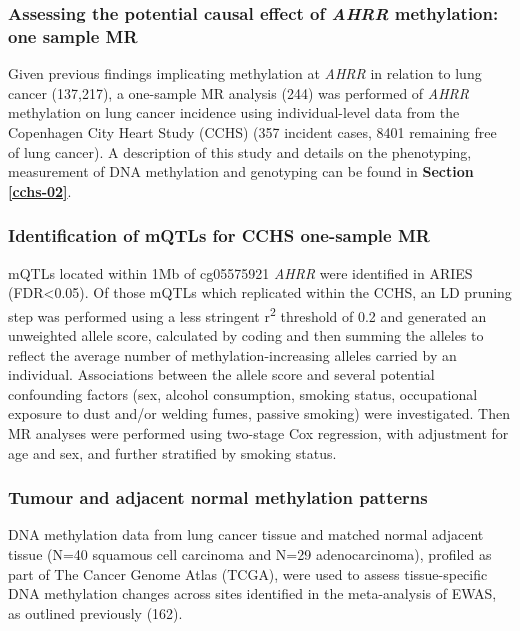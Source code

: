 \documentclass[11pt,twoside]{bristolthesis}
\begin{document}
\hypertarget{ahrr-one-sample-mr-methods}{%
\subsubsection{\texorpdfstring{Assessing the potential causal effect of \emph{AHRR} methylation: one sample MR}{Assessing the potential causal effect of AHRR methylation: one sample MR}}\label{ahrr-one-sample-mr-methods}}

Given previous findings implicating methylation at \emph{AHRR} in relation to lung cancer (137,217), a one-sample MR analysis (244) was performed of \emph{AHRR} methylation on lung cancer incidence using individual-level data from the Copenhagen City Heart Study (CCHS) (357 incident cases, 8401 remaining free of lung cancer). A description of this study and details on the phenotyping, measurement of DNA methylation and genotyping can be found in \textbf{Section \ref{cchs-02}}.

\hypertarget{identification-of-mqtls-for-cchs-one-sample-mr}{%
\subsubsection{Identification of mQTLs for CCHS one-sample MR}\label{identification-of-mqtls-for-cchs-one-sample-mr}}

mQTLs located within 1Mb of cg05575921 \emph{AHRR} were identified in ARIES (FDR\textless0.05). Of those mQTLs which replicated within the CCHS, an LD pruning step was performed using a less stringent r\textsuperscript{2} threshold of 0.2 and generated an unweighted allele score, calculated by coding and then summing the alleles to reflect the average number of methylation-increasing alleles carried by an individual. Associations between the allele score and several potential confounding factors (sex, alcohol consumption, smoking status, occupational exposure to dust and/or welding fumes, passive smoking) were investigated. Then MR analyses were performed using two-stage Cox regression, with adjustment for age and sex, and further stratified by smoking status.

\hypertarget{lc-heathly-v-normal-methods}{%
\subsubsection{Tumour and adjacent normal methylation patterns}\label{lc-heathly-v-normal-methods}}

DNA methylation data from lung cancer tissue and matched normal adjacent tissue (N=40 squamous cell carcinoma and N=29 adenocarcinoma), profiled as part of The Cancer Genome Atlas (TCGA), were used to assess tissue-specific DNA methylation changes across sites identified in the meta-analysis of EWAS, as outlined previously (162).
\end{document}
